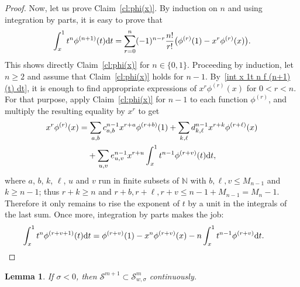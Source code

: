 \documentclass[11pt]{article}
\newtheorem{Lemma}[Theorem]{Lemma}
\newcommand{\N}{\mathbb{N}}
\renewcommand{\SS}{\mathcal{S}}
\begin{document}
\begin{proof}
  Now, let us prove Claim~\ref{cl:phi(x)}. By induction on $n$ and using integration by parts, it is easy to prove that
    \begin{gather}\label{int x 1t n f (n+1)(t) dt}
      \int_x^1t^n\phi^{(n+1)}(t){\rm d}t=\sum_{r=0}^n(-1)^{n-r} \frac{n!}{r!} \bigl(\phi^{(r)}(1)-x^r\phi^{(r)}(x)\bigr) .
      \end{gather}
  This shows directly Claim~\ref{cl:phi(x)} for $n\in\{0,1\}$. Proceeding by induction, let $n\ge2$ and assume that Claim~\ref{cl:phi(x)} holds for $n-1$. By~\eqref{int x 1t n f (n+1)(t) dt}, it is enough to f\/ind appropriate expressions of $x^r\phi^{(r)}(x)$ for $0<r<n$. For that purpose, apply Claim~\ref{cl:phi(x)} for $n-1$ to each function $\phi^{(r)}$, and multiply the resulting equality by $x^r$ to get
    \begin{gather*}
    \begin{split}
    &  x^r\phi^{(r)}(x)=\sum_{a,b}c^{n-1}_{a,b}x^{r+a}\phi^{(r+b)}(1)+\sum_{k,\ell}d^{n-1}_{k,\ell}x^{r+k}\phi^{(r+\ell)}(x)\\
& \hphantom{x^r\phi^{(r)}(x)=}{}+\sum_{u,v}e^{n-1}_{u,v}x^{r+u}\int_x^1t^{n-1}\phi^{(r+v)}(t){\rm d}t ,
\end{split}
    \end{gather*}
  where $a$, $b$, $k$, $\ell$, $u$ and $v$ run in f\/inite subsets of $\N$ with $b,\ell,v\le M_{n-1}$ and $k\ge n-1$; thus $r+k\ge n$ and $r+b,r+\ell,r+v\le n-1+M_{n-1}=M_n-1$. Therefore it only remains to rise the exponent of $t$ by a unit in the integrals of the last sum. Once more, integration by parts makes the job:
    \begin{gather*}
      \int_x^1t^n\phi^{(r+v+1)}(t){\rm d}t=\phi^{(r+v)}(1)-x^n\phi^{(r+v)}(x)-n\int_x^1t^{n-1}\phi^{(r+v)}{\rm d}t .\tag*{\qed}
    \end{gather*}
\renewcommand{\qed}{}
\end{proof}

\begin{Lemma}\label{l:SS m+1 subset SS w,sigma m}
  If $\sigma<0$, then $\SS^{m+1}\subset\SS_{w,\sigma}^m$ continuously.
\end{Lemma}
\end{document}

